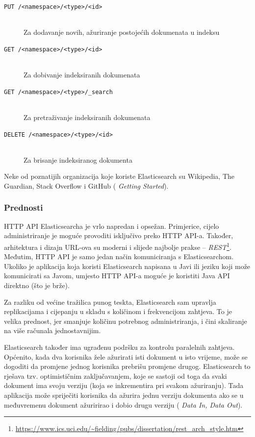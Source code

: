 \documentclass[a4paper,twoside,12pt]{scrreprt}
\begin{document}
\begin{description}
  \item[\texttt{PUT /<namespace>/<type>/<id>}] \hfill \\ Za dodavanje novih, ažuriranje postojećih dokumenata u indeksu
  \item[\texttt{GET /<namespace>/<type>/<id>}] \hfill \\ Za dobivanje indeksiranih dokumenata
  \item[\texttt{GET /<namespace>/<type>/\_search}] \hfill \\ Za pretraživanje indeksiranih dokumenata
  \item[\texttt{DELETE /<namespace>/<type>/<id>}] \hfill \\ Za brisanje indeksiranog dokumenta
\end{description}

Neke od poznatijih organizacija koje koriste Elasticsearch su Wikipedia, The Guardian, Stack Overflow i GitHub (\cite{elasticguide} \textit{Getting Started}).

\subsubsection{Prednosti}

HTTP API Elasticsearcha je vrlo napredan i opsežan. Primjerice, cijelo administriranje je moguće provoditi isključivo preko HTTP API-a. Također, arhitektura i dizajn URL-ova su moderni i slijede najbolje prakse – \textit{REST}\footnote{\url{https://www.ics.uci.edu/~fielding/pubs/dissertation/rest_arch_style.htm}}. Međutim, HTTP API je samo jedan način komuniciranja s Elasticsearchom. Ukoliko je aplikacija koja koristi Elasticsearch napisana u Javi ili jeziku koji može komunicirati sa Javom, umjesto HTTP API-a moguće je koristiti Java API direktno (što je brže).

Za razliku od većine tražilica punog teskta, Elasticsearch sam upravlja replikacijama i cijepanju u skladu s količinom i frekvencijom zahtjeva. To je velika prednost, jer smanjuje količinu potrebnog administriranja, i čini skaliranje na više računala jednostavnijim.

Elasticsearch također ima ugrađenu podršku za kontrolu paralelnih zahtjeva. Općenito, kada dva korisnika žele ažurirati isti dokument u isto vrijeme, može se dogoditi da promjene jednog korisnika prebrišu promjene drugog. Elasticsearch to rješava tzv. optimističnim zaključavanjem, koje se sastoji od toga da svaki dokument ima svoju verziju (koja se inkrementira pri svakom ažuriranju). Tada aplikacija može spriječiti korisnika da ažurira jednu verziju dokumenta ako se u međuvremenu dokument ažuririrao i dobio drugu verziju (\cite{elasticguide} \textit{Data In, Data Out}).
\end{document}

